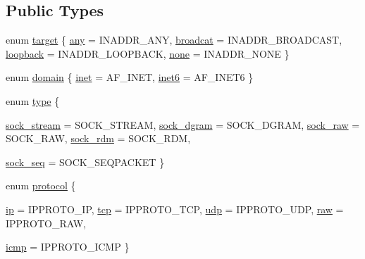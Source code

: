 \subsection*{Public Types}
\begin{CompactItemize}
\item 
enum \hyperlink{classusock_1_1BaseSocket_50d8769de87937b42f8cef370917aa0b}{target} \{ \hyperlink{classusock_1_1BaseSocket_50d8769de87937b42f8cef370917aa0b13bac8e60708dc8451b1addafbd3dd77}{any} =  INADDR\_\-ANY, 
\hyperlink{classusock_1_1BaseSocket_50d8769de87937b42f8cef370917aa0b1bf59b5083e7c55e7bf86ec50291d617}{broadcat} =  INADDR\_\-BROADCAST, 
\hyperlink{classusock_1_1BaseSocket_50d8769de87937b42f8cef370917aa0bbefd2832243f347df978af6409917c38}{loopback} =  INADDR\_\-LOOPBACK, 
\hyperlink{classusock_1_1BaseSocket_50d8769de87937b42f8cef370917aa0b2e5c5b23744de44c69004e477510d95b}{none} =  INADDR\_\-NONE
 \}
\item 
enum \hyperlink{classusock_1_1BaseSocket_a51cae0b366638a5f697f64174135d90}{domain} \{ \hyperlink{classusock_1_1BaseSocket_a51cae0b366638a5f697f64174135d904293c75d794987e0017bab42bbbcbf73}{inet} =  AF\_\-INET, 
\hyperlink{classusock_1_1BaseSocket_a51cae0b366638a5f697f64174135d9089db67cd78ea92b1ca5bf823ca967680}{inet6} =  AF\_\-INET6
 \}
\item 
enum \hyperlink{classusock_1_1BaseSocket_8117d25c7b482eb594d68137868ce5f9}{type} \{ \par
\hyperlink{classusock_1_1BaseSocket_8117d25c7b482eb594d68137868ce5f94052647af14af3924e9b994a5ab53b8e}{sock\_\-stream} =  SOCK\_\-STREAM, 
\hyperlink{classusock_1_1BaseSocket_8117d25c7b482eb594d68137868ce5f95b0f0651f7544fbc1fedc8997d914365}{sock\_\-dgram} =  SOCK\_\-DGRAM, 
\hyperlink{classusock_1_1BaseSocket_8117d25c7b482eb594d68137868ce5f9d3b8cbf378c46eb82b5a0039eab34ca7}{sock\_\-raw} =  SOCK\_\-RAW, 
\hyperlink{classusock_1_1BaseSocket_8117d25c7b482eb594d68137868ce5f9e04a390261efe04335235f26a00b72d5}{sock\_\-rdm} =  SOCK\_\-RDM, 
\par
\hyperlink{classusock_1_1BaseSocket_8117d25c7b482eb594d68137868ce5f9adfa1bc59768fc0be580b4ba95c6f357}{sock\_\-seq} =  SOCK\_\-SEQPACKET
 \}
\item 
enum \hyperlink{classusock_1_1BaseSocket_09208675b41c416fb402824742963eaa}{protocol} \{ \par
\hyperlink{classusock_1_1BaseSocket_09208675b41c416fb402824742963eaabf22c7bfd50adb88e468d3744e932497}{ip} =  IPPROTO\_\-IP, 
\hyperlink{classusock_1_1BaseSocket_09208675b41c416fb402824742963eaa3a17ad9b4036c0957dc098c76e8fba2a}{tcp} =  IPPROTO\_\-TCP, 
\hyperlink{classusock_1_1BaseSocket_09208675b41c416fb402824742963eaae0719b1eee901237a5ec0ba9031cdfce}{udp} =  IPPROTO\_\-UDP, 
\hyperlink{classusock_1_1BaseSocket_09208675b41c416fb402824742963eaa0d09509fb52df026fec01b98795f9ac4}{raw} =  IPPROTO\_\-RAW, 
\par
\hyperlink{classusock_1_1BaseSocket_09208675b41c416fb402824742963eaa5c569c4f7525d07ee96857a015d057bb}{icmp} =  IPPROTO\_\-ICMP
 \}
\end{CompactItemize}
